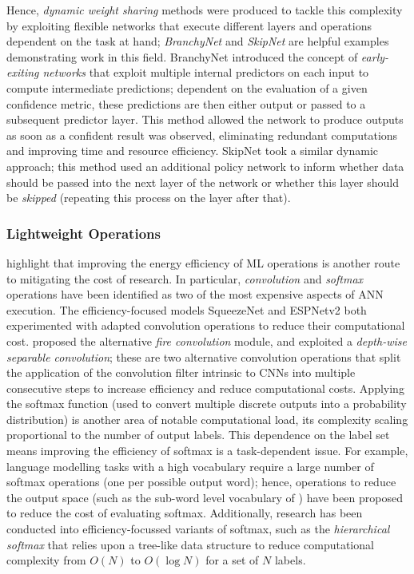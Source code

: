 \documentclass[a4paper, 12pt]{article}
\begin{document}
    Hence, \emph{dynamic weight sharing} methods were produced to tackle this complexity by exploiting flexible networks that execute different layers and operations dependent on the task at hand; \emph{BranchyNet} \cite{teerapittayanon-2017} and \emph{SkipNet} \cite{wang-2017} are helpful examples demonstrating work in this field. BranchyNet introduced the concept of \emph{early-exiting networks} that exploit multiple internal predictors on each input to compute intermediate predictions; dependent on the evaluation of a given confidence metric, these predictions are then either output or passed to a subsequent predictor layer. This method allowed the network to produce outputs as soon as a confident result was observed, eliminating redundant computations and improving time and resource efficiency. SkipNet took a similar dynamic approach; this method used an additional policy network to inform whether data should be passed into the next layer of the network or whether this layer should be \emph{skipped} (repeating this process on the layer after that).

    \subsubsection{Lightweight Operations}

     highlight that improving the energy efficiency of ML operations is another route to mitigating the cost of research. In particular, \emph{convolution} and \emph{softmax} operations have been identified as two of the most expensive aspects of ANN execution. The efficiency-focused models SqueezeNet \cite{iandola-2016} and ESPNetv2 \cite{mehta-2018} both experimented with adapted convolution operations to reduce their computational cost.  proposed the alternative \emph{fire convolution} module, and  exploited a \emph{depth-wise separable convolution}; these are two alternative convolution operations that split the application of the convolution filter intrinsic to CNNs into multiple consecutive steps to increase efficiency and reduce computational costs. Applying the softmax function (used to convert multiple discrete outputs into a probability distribution) is another area of notable computational load, its complexity scaling proportional to the number of output labels. This dependence on the label set means improving the efficiency of softmax is a task-dependent issue. For example, language modelling tasks with a high vocabulary require a large number of softmax operations (one per possible output word); hence, operations to reduce the output space (such as the sub-word level vocabulary of ) have been proposed to reduce the cost of evaluating softmax. Additionally, research has been conducted into efficiency-focussed variants of softmax, such as the \emph{hierarchical softmax} \cite{morin-bengio-2005} that relies upon a tree-like data structure to reduce computational complexity from $O(N)$ to $O(\log N)$ for a set of $N$ labels.
\end{document}
